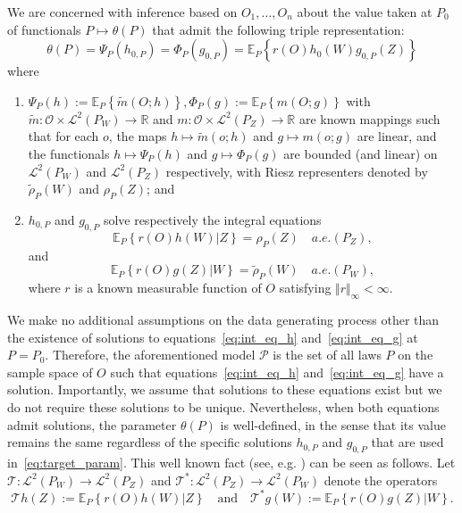 \documentclass[twoside,11pt]{article}
\newcommand{\E}{\mathbb{E}}
\newcommand{\mc}{\mathcal}
\begin{document}
We are concerned with inference based on $O_1, \dots, O_n$ about the value taken at $P_0$ of functionals $P \mapsto \theta(P)$ that admit the following triple representation:
\begin{equation}
    \theta(P)=\Psi_P(h_{0,P})=\Phi_P(g_{0,P})=\mathbb{E}_P\left\{r(O)h_0(W)g_{0,P}(Z)\right\}\label{eq:target_param}
\end{equation}
where 
\begin{enumerate}
    \item 
    $\Psi_P(h) :=\mathbb{E}_P\left\{\widetilde{m}(O;h)\right\}, \Phi_P(g) :=\mathbb{E}_P\left\{m(O;g)\right\} $
    with $\widetilde{m}:\mc{O}\times\mc{L}^2(P_W)\rightarrow\mathbb{R}$ and  $m:\mc{O}\times\mc{L}^2(P_Z)\rightarrow\mathbb{R}$ are known mappings such that for each $o$, the maps $h \mapsto \tilde {m}(o;h)$ and $g\mapsto m(o;g)$ are linear, and the functionals $h\mapsto\Psi_P(h)$ and $g\mapsto\Phi_P(g)$
are bounded (and linear) on $\mc{L}^2(P_W)$ and $\mc{L}^2(P_Z)$ respectively, with Riesz representers denoted by $\tilde\rho_P(W)$ and $\rho_P(Z)$; and
\item $h_{0,P}$ and $g_{0,P}$ solve respectively the integral equations 
\begin{equation}
    \E_P\left\{r(O)h(W)|Z\right\}=\rho_{P} (Z) \quad a.e. (P_Z),\label{eq:int_eq_h}
\end{equation}
and 
\begin{equation}
    \E_P\left\{r(O)g(Z)|W\right\}=\tilde\rho_{P} (W) \quad a.e. (P_W)\label{eq:int_eq_g},
\end{equation} 
where $r$ is a known measurable function of $O$ satisfying $\Vert r\Vert_{\infty} < \infty $. 
\end{enumerate}

We make no additional assumptions on the data generating process other than the existence of solutions to equations~\eqref{eq:int_eq_h} and~\eqref{eq:int_eq_g} at $P=P_0$. Therefore, the aforementioned model $\mc{P}$ is the set of all laws $P$ on the sample space of $O$ such that equations~\eqref{eq:int_eq_h} and~\eqref{eq:int_eq_g} have a solution.
Importantly, we assume that solutions to these equations exist but we do not require these solutions to be unique. Nevertheless, when both equations admit solutions, the parameter $\theta(P)$ is well-defined, in the sense that its value remains the same regardless of the specific solutions $h_{0,P}$ and $g_{0,P}$ that are used in~\eqref{eq:target_param}. This well known fact (see, e.g. \citet{severini2012efficiency}) can be seen as follows. Let $\mc{T}:\mc{L}^2(P_W)\rightarrow\mc{L}^2(P_Z)$ and $\mc{T}^*:\mc{L}^2(P_Z)\rightarrow\mc{L}^2(P_W)$ denote the operators
\begin{equation*}
    \mc{T}h(Z):=\E_P\left\{r(O)h(W)|Z\right\} \quad \text{and} \quad \mc{T}^*g(W):=\E_P\left\{r(O)g(Z)|W\right\}.
\end{equation*}
\end{document}
